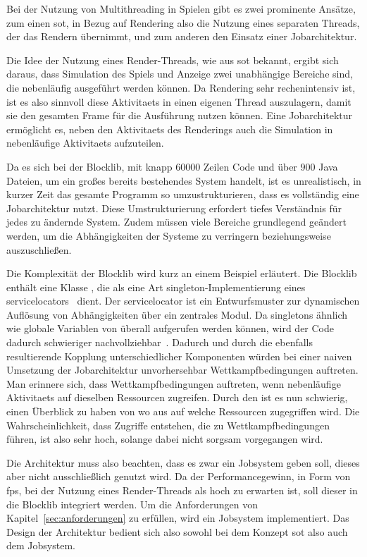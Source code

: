 Bei der Nutzung von Multithreading in Spielen gibt es zwei prominente Ansätze, zum einen \ac{sot}, in Bezug auf Rendering also die Nutzung eines separaten Threads, der das Rendern übernimmt, und zum anderen den Einsatz einer Jobarchitektur.

Die Idee der Nutzung eines Render-Threads, wie aus \ac{sot} bekannt, ergibt sich daraus, dass Simulation des Spiels und Anzeige zwei unabhängige Bereiche sind, die nebenläufig ausgeführt werden können. Da Rendering sehr rechenintensiv ist, ist es also sinnvoll diese \glspl{Aktivitaet} in einen eigenen Thread auszulagern, damit sie den gesamten Frame für die Ausführung nutzen können. Eine Jobarchitektur ermöglicht es, neben den \glspl{Aktivitaet} des Renderings auch die Simulation in nebenläufige \glspl{Aktivitaet} aufzuteilen. 

Da es sich bei der Blocklib, mit knapp $60000$ Zeilen Code und über $900$ Java Dateien, um ein großes bereits bestehendes System handelt, ist es unrealistisch, in kurzer Zeit das gesamte \gls{Programm} so umzustrukturieren, dass es vollständig eine Jobarchitektur nutzt. Diese Umstrukturierung erfordert tiefes Verständnis für jedes zu ändernde System. Zudem müssen viele Bereiche grundlegend geändert werden, um die Abhängigkeiten der Systeme zu verringern beziehungsweise auszuschließen.

Die Komplexität der Blocklib wird kurz an einem Beispiel erläutert. Die Blocklib enthält eine Klasse , die als eine Art \gls{singleton}-Implementierung eines \glspl{servicelocator}~\cite[S.~301~ff.]{Nystrom2015} dient. Der \gls{servicelocator} ist ein Entwurfsmuster zur dynamischen Auflösung von Abhängigkeiten über ein zentrales Modul. Da \glspl{singleton} ähnlich wie globale Variablen von überall aufgerufen werden können, wird der Code dadurch schwieriger nachvollziehbar~\cite[S.~108]{Nystrom2015}. Dadurch und durch die ebenfalls resultierende Kopplung unterschiedlicher Komponenten würden bei einer naiven Umsetzung der Jobarchitektur unvorhersehbar Wettkampfbedingungen auftreten.
Man erinnere sich, dass Wettkampfbedingungen auftreten, wenn nebenläufige \glspl{Aktivitaet} auf dieselben Ressourcen zugreifen. Durch den  ist es nun schwierig, einen Überblick zu haben von wo aus auf welche Ressourcen zugegriffen wird. Die Wahrscheinlichkeit, dass Zugriffe entstehen, die zu Wettkampfbedingungen führen, ist also sehr hoch, solange dabei nicht sorgsam vorgegangen wird.

Die Architektur muss also beachten, dass es zwar ein Jobsystem geben soll, dieses aber nicht ausschließlich genutzt wird. Da der Performancegewinn, in Form von \ac{fps}, bei der Nutzung eines Render-Threads als hoch zu erwarten ist, soll dieser in die Blocklib integriert werden. Um die Anforderungen von Kapitel~\ref{sec:anforderungen} zu erfüllen, wird ein Jobsystem implementiert. Das Design der Architektur bedient sich also sowohl bei dem Konzept \ac{sot} also auch dem Jobsystem.
